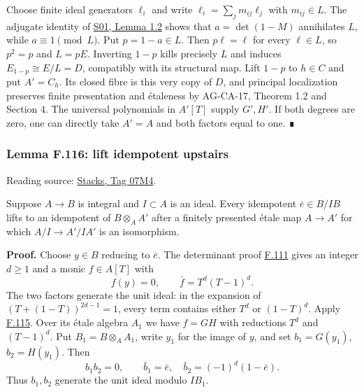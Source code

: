 \documentclass[11pt,a4paper,openany]{report}
\begin{document}
Choose finite ideal generators \(\ell_i\) and write \(\ell_i=\sum_j m_{ij}\ell_j\) with \(m_{ij}\in L\). The adjugate identity of \href{https://github.com/KokunoYumeto/open-math-courses/blob/main/docs/courses/AG-RG/AG-RG-S01.md}{S01, Lemma 1.2} shows that \(a=\det(1-M)\) annihilates \(L\), while \(a\equiv1\pmod L\). Put \(p=1-a\in L\). Then \(p\ell=\ell\) for every \(\ell\in L\), so \(p^2=p\) and \(L=pE\). Inverting \(1-p\) kills precisely \(L\) and induces \(E_{1-p}\cong E/L=D\), compatibly with its structural map. Lift \(1-p\) to \(h\in C\) and put \(A'=C_h\). Its closed fibre is this very copy of \(D\), and principal localization preserves finite presentation and étaleness by AG-CA-17, Theorem 1.2 and Section 4. The universal polynomials in \(A'[T]\) supply \(G',H'\). If both degrees are zero, one can directly take \(A'=A\) and both factors equal to one. ∎

\label{AG-RG-S05-more-algebra-lemma-lift-idempotent-upstairs}

\subsubsection{Lemma F.116: lift idempotent upstairs}\label{AG-RG-S05-lemma-f.116-lift-idempotent-upstairs}

Reading source: \href{https://stacks.math.columbia.edu/tag/07M4}{Stacks, Tag 07M4}.

Suppose \(A\to B\) is integral and \(I\subset A\) is an ideal. Every idempotent \(\bar e\in B/IB\) lifts to an idempotent of \(B\otimes_A A'\) after a finitely presented étale map \(A\to A'\) for which \(A/I\to A'/IA'\) is an isomorphism.

\textbf{Proof.} Choose \(y\in B\) reducing to \(\bar e\). The determinant proof \hyperref[AG-RG-S05-more-algebra-lemma-helper-integral]{F.111} gives an integer \(d\ge1\) and a monic \(f\in A[T]\) with \[
f(y)=0,\qquad \bar f=T^d(T-1)^d.
\] The two factors generate the unit ideal: in the expansion of \((T+(1-T))^{2d-1}=1\), every term contains either \(T^d\) or \((1-T)^d\). Apply \hyperref[AG-RG-S05-more-algebra-lemma-lift-factorization-monic]{F.115}. Over its étale algebra \(A_1\) we have \(f=GH\) with reductions \(T^d\) and \((T-1)^d\). Put \(B_1=B\otimes_AA_1\), write \(y_1\) for the image of \(y\), and set \(b_1=G(y_1)\), \(b_2=H(y_1)\). Then \[
b_1b_2=0,\qquad
\bar b_1=\bar e,\quad \bar b_2=(-1)^d(1-\bar e).
\] Thus \(b_1,b_2\) generate the unit ideal modulo \(IB_1\).
\end{document}
